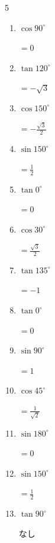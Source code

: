 \begin{multicols}{5}
\begin{enumerate}
  \item $\displaystyle \cos{90^\circ}$

        $\displaystyle =0$

  \item $\displaystyle \tan{120^\circ}$

        $\displaystyle =-\sqrt{3}$

  \item $\displaystyle \cos{150^\circ}$

        $\displaystyle =-\frac{\sqrt{3}}{2}$

  \item $\displaystyle \sin{150^\circ}$

        $\displaystyle =\frac{1}{2}$

  \item $\displaystyle \tan{0^\circ}$

        $\displaystyle =0$

  \item $\displaystyle \cos{30^\circ}$

        $\displaystyle =\frac{\sqrt{3}}{2}$

  \item $\displaystyle \tan{135^\circ}$

        $\displaystyle =-1$

  \item $\displaystyle \tan{0^\circ}$

        $\displaystyle =0$

\columnbreak %

\resetques

  \item $\displaystyle \sin{90^\circ}$

        $\displaystyle =1$

  \item $\displaystyle \cos{45^\circ}$

        $\displaystyle =\frac{1}{\sqrt{2}}$

  \item $\displaystyle \sin{180^\circ}$

        $\displaystyle =0$

  \item $\displaystyle \sin{150^\circ}$

        $\displaystyle =\frac{1}{2}$

  \item $\displaystyle \tan{90^\circ}$

        $\displaystyle なし$


\end{enumerate}
\end{multicols}
